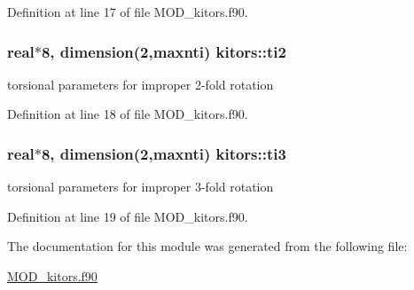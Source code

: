 Definition at line 17 of file M\-O\-D\-\_\-kitors.\-f90.

\hypertarget{classkitors_a25ca877a63bcba26a3e4ac2dd8b46c90}{
\subsubsection[{ti2}]{\setlength{\rightskip}{0pt plus 5cm}real$\ast$8, dimension(2,{\bf maxnti}) kitors\-::ti2}}\label{classkitors_a25ca877a63bcba26a3e4ac2dd8b46c90}


torsional parameters for improper 2-\/fold rotation 



Definition at line 18 of file M\-O\-D\-\_\-kitors.\-f90.

\hypertarget{classkitors_a150f6f9b432aaa18bab41726cb910d19}{
\subsubsection[{ti3}]{\setlength{\rightskip}{0pt plus 5cm}real$\ast$8, dimension(2,{\bf maxnti}) kitors\-::ti3}}\label{classkitors_a150f6f9b432aaa18bab41726cb910d19}


torsional parameters for improper 3-\/fold rotation 



Definition at line 19 of file M\-O\-D\-\_\-kitors.\-f90.



The documentation for this module was generated from the following file\-:\begin{DoxyCompactItemize}
\item 
\hyperlink{MOD__kitors_8f90}{M\-O\-D\-\_\-kitors.\-f90}\end{DoxyCompactItemize}
